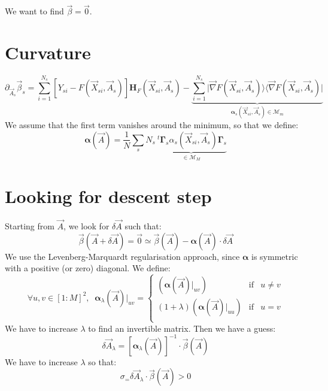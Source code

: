 \documentclass[aps,12pt]{revtex4}
\newcommand{\trn}[1]{~^t{#1}}
\begin{document}
We want to find $\vec{\beta} = \vec{0}$.

\section{Curvature}
\begin{equation}
	\partial_{\vec{A}_s} \vec{\beta}_s = \sum_{i=1}^{N_s}  \left[ Y_{si} - F(\vec{X}_{si},\vec{A}_s) \right] \bm{H}_F(\vec{X}_{si},\vec{A}_s)
	- \underbrace{
	\sum_{i=1}^{N_s} \vert\vec{\nabla} F(\vec{X}_{si},\vec{A}_s) \rangle  \langle\vec{\nabla} F(\vec{X}_{si},\vec{A}_s)\vert
	}_{\bm{\alpha}_s(\vec{X}_{si},\vec{A}_s)\in\mathcal{M}_{m} }
\end{equation}
We assume that the first term vanishes around the minimum, so that we define:
\begin{equation}
	\bm{\alpha}(\vec{A}) = \dfrac{1}{N} \sum_s N_s \underbrace{\trn{\bm{\Gamma}_s} \alpha_s (\vec{X}_{si},\vec{A}_s) \bm{\Gamma}_s}_{\in \mathcal{M}_M}
\end{equation}

\section{Looking for descent step}

Starting from $\vec{A}$, we look for $\delta\vec{A}$ such that:
\begin{equation}
	\vec{\beta}(\vec{A}+\delta\vec{A}) = \vec{0} \simeq \vec{\beta}(\vec{A}) - \bm{\alpha}(\vec{A}) \cdot \delta \vec{A}
\end{equation}
We use the Levenberg-Marquardt regularisation approach, since $\bm{\alpha}$ is symmetric with a positive (or zero) diagonal.
We define:
\begin{equation}
\forall u,v \in [1:M]^2, \;\;
	\bm{\alpha}_{\lambda}(\vec{A})\vert_{uv} = 
	\left\lbrace
	\begin{array}{rcl}
	(\bm{\alpha}(\vec{A})\vert_{uv}) & \text{if} & u\not=v\\
	(1+\lambda)(\bm{\alpha}(\vec{A})\vert_{uu})  & \text{if} & u=v\\
	\end{array}
	\right.
\end{equation}
We have to increase $\lambda$ to find an invertible matrix.
Then we have a guess:
\begin{equation}
	\delta\vec{A}_\lambda = \left[\bm{\alpha}_\lambda(\vec{A})\right]^{-1} \cdot \vec{\beta}(\vec{A})
\end{equation}
We have to increase $\lambda$ so that:
\begin{equation}
	\sigma_ = \delta\vec{A}_\lambda \cdot \vec{\beta}(\vec{A}) > 0
\end{equation}
 
\end{document}
